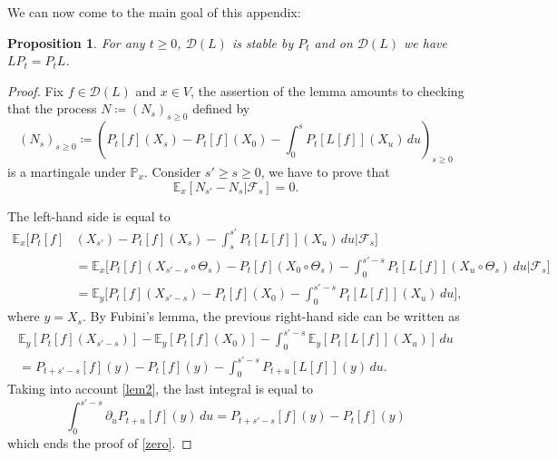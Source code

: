 \documentclass[JEP,XML,SOM,Unicode,NoFloatCountersInSection,published]{cedram}
\theoremstyle{plain}
\newtheorem{prop}[thm]{Proposition}
\theoremstyle{definition}
\newcommand{\EE}{{\mathbb E}}
\newcommand{\PP}{{\mathbb P}}
\newcommand\df{\coloneqq}
\newcommand{\bq}{\begin{equation*}}
\newcommand{\bqn}[1]{\begin{equation}\label{#1}}
\newcommand{\eq}{\end{equation*}}
\newcommand{\eqn}{\end{equation}}
\newcommand{\lt}{\left}
\newcommand{\rt}{\right}
\let\pa\partial
\newcommand{\cD}{\mathcal{D}}
\newcommand{\cF}{\mathcal{F}}
\begin{document}
\par
We can now come to the main goal of this appendix:
\begin{prop}\label{pro1}
For any $t\geq 0$, $\cD(L)$ is stable by $P_t$ and on $\cD(L)$ we have $LP_t=P_tL$.
\end{prop}
\begin{proof}
Fix $f\in\cD(L)$ and $x\in V$, the assertion of the lemma amounts to checking that the process $N\df (N_s)_{s\geq 0}$ defined by
\bq
(N_s)_{s\geq 0}\df \lt(P_t[f](X_s)-P_t[f](X_0)-\int_0^s P_t[L[f]](X_u)\,du\rt)_{s\geq 0}\eq
is a martingale under $\PP_x$.
Consider $s'\geq s\geq 0$, we have to prove that
\bqn{zero}
\EE_x[N_{s'}-N_s\vert\cF_s]=0.\eqn
\par
The left-hand side is equal to
\begin{align*}
\EE_x\biggl[ P_t[f]&(X_{s'})-P_t[f](X_s)-\int_s^{s'} P_t[L[f]](X_u)\,du \Big\vert\cF_s\biggr]\\
&=
\EE_x\biggl[ P_t[f](X_{s'-s}\circ \Theta_s)-P_t[f](X_0\circ \Theta_s)-\int_0^{s'-s} P_t[L[f]](X_u\circ \Theta_s)\,du \Big\vert\cF_s\biggr]\\
&=\EE_y\biggl[ P_t[f](X_{s'-s})-P_t[f](X_0)-\int_0^{s'-s} P_t[L[f]](X_u)\,du\biggr],
\end{align*}
where $y=X_s$. By Fubini's lemma, the previous right-hand side can be written as
\begin{multline*}
\EE_y\lt[ P_t[f](X_{s'-s})\rt]-\EE_y\lt[ P_t[f](X_0)\rt]-\int_0^{s'-s} \EE_y[P_t[L[f]](X_u)]\,du\\
=P_{t+s'-s}[f](y)-P_t[f](y)-\int_0^{s'-s} P_{t+u}[L[f]](y)\,du.
\end{multline*}
Taking into account \eqref{lem2}, the last integral is equal to
\bq
\int_0^{s'-s} \pa_u P_{t+u}[f](y)\,du=P_{t+s'-s}[f](y)-P_t[f](y)\eq
which ends the proof of \eqref{zero}.
\end{proof}
\end{document}
